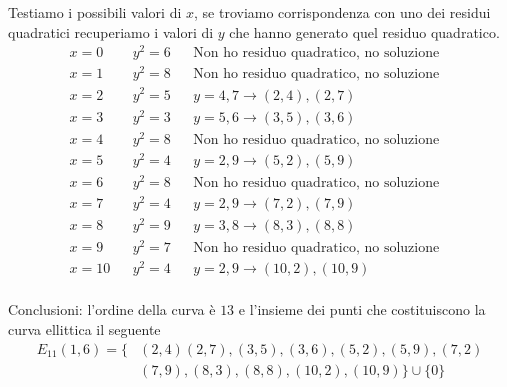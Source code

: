 \begin{framed}
\begin{itemize}
		Testiamo i possibili valori di $x$, se troviamo corrispondenza con uno dei residui quadratici recuperiamo i valori di $y$ che hanno generato quel residuo quadratico.
		\begin{align*}
			x=0&&y^2=6&& \text{Non ho residuo quadratico, no soluzione}\\
			x=1&&y^2=8&& \text{Non ho residuo quadratico, no soluzione}\\
			x=2&&y^2=5&&y=4,7 \longrightarrow (2,4),(2,7)\\
			x=3&&y^2=3&&y=5,6 \longrightarrow (3,5),(3,6)\\
			x=4&&y^2=8&& \text{Non ho residuo quadratico, no soluzione}\\
			x=5&&y^2=4&&y=2,9 \longrightarrow (5,2),(5,9)&\\
			x=6&&y^2=8&& \text{Non ho residuo quadratico, no soluzione}\\
			x=7&&y^2=4&&y=2,9 \longrightarrow (7,2),(7,9)\\
			x=8&&y^2=9&&y=3,8 \longrightarrow (8,3),(8,8)\\
			x=9&&y^2=7&& \text{Non ho residuo quadratico, no soluzione}\\
			x=10&&y^2=4&&y=2,9 \longrightarrow (10,2),(10,9)\\
		\end{align*}
	\end{itemize}
Conclusioni: l'ordine della curva è $13$ e l'insieme dei punti che costituiscono la curva ellittica il seguente
\begin{align*}
	E_{11}(1,6)=\{&(2,4)(2,7),(3,5),(3,6),(5,2),(5,9),(7,2)\\&(7,9),(8,3),(8,8),(10,2),(10,9)\} \cup \{0\}
\end{align*}
	
\end{framed} 

